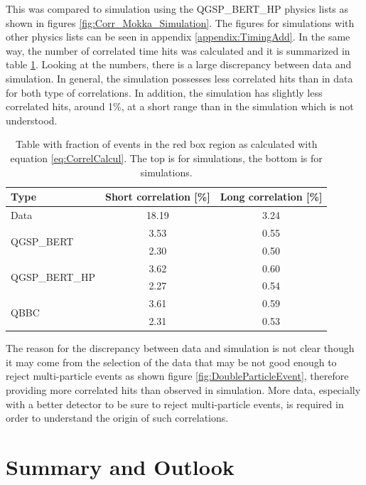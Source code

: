This was compared to simulation using the QGSP\_BERT\_HP physics lists as shown in figures \ref{fig:Corr_Mokka_Simulation}. The figures for simulations with other physics lists can be seen in appendix \ref{appendix:TimingAdd}. In the same way, the number of correlated time hits was calculated and it is summarized in table \ref{table:Correlation_DataSim}. Looking at the numbers, there is a large discrepancy between data and simulation. In general, the simulation possesses less correlated hits than in data for both type of correlations. In addition, the \ddhep simulation has slightly less correlated hits, around 1\%, at a short range than in the \mokka simulation which is not understood.

\begin{table}[htb!]
	\centering
	\caption{Table with fraction of events in the red box region as calculated with equation \ref{eq:CorrelCalcul}. The top is for \mokka simulations, the bottom is for \ddhep simulations.}
	\label{table:Correlation_DataSim}
	\begin{tabular}{@{} lcc @{}}
		\toprule
		Type & Short correlation [\%] & Long correlation [\%]\\
		\midrule
		\multirow{2}{*}{Data} & \multirow{2}{*}{18.19} & \multirow{2}{*}{3.24}\\ & &\\
		\midrule
		\multirow{2}{*}{QGSP\_BERT} & 3.53 & 0.55\\ & 2.30 & 0.50\\
		\multirow{2}{*}{QGSP\_BERT\_HP} & 3.62 & 0.60\\ & 2.27 & 0.54\\
		\multirow{2}{*}{QBBC} & 3.61 & 0.59\\ & 2.31 & 0.53\\
		\bottomrule
	\end{tabular}
\end{table}

The reason for the discrepancy between data and simulation is not clear though it may come from the selection of the data that may be not good enough to reject multi-particle events as shown figure \ref{fig:DoubleParticleEvent}, therefore providing more correlated hits than observed in simulation. More data, especially with a better detector to be sure to reject multi-particle events, is required in order to understand the origin of such correlations.

\newpage
\section{Summary and Outlook}

